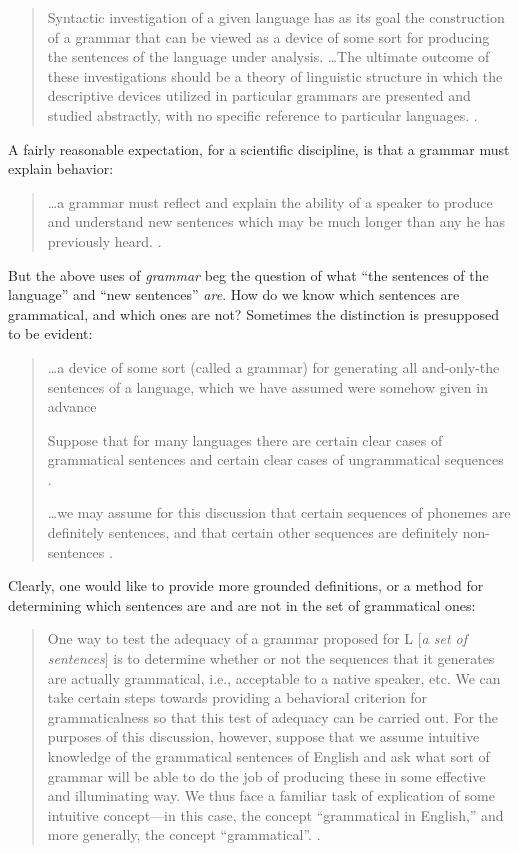 \begin{quote}
Syntactic investigation of a given language has as its goal the construction of a grammar that can be viewed as a device of some sort for producing the sentences of the language under analysis. …The ultimate outcome of these investigations should be a theory of linguistic structure in which the descriptive devices utilized in particular grammars are presented and studied abstractly, with no specific reference to particular languages. \citep[11]{Chomsky1957}.
\end{quote}

A fairly reasonable expectation, for a scientific discipline, is that a grammar must explain behavior:

\begin{quote}
…a grammar must reflect and explain the ability of a speaker to produce and understand new sentences which may be much longer than any he has previously heard. \citep[124]{Chomsky1956}.
\end{quote}

  But the above uses of \textit{grammar} beg the question of what “the sentences of the language” and “new sentences” \textit{are}. How do we know which sentences are grammatical, and which ones are not? Sometimes the distinction is presupposed to be evident:

\begin{quote}
…a device of some sort (called a grammar) for generating all and-only-the sentences of a language, which we have assumed were somehow given in advance \citep[85]{Chomsky1957}

Suppose that for many languages there are certain clear cases of grammatical sentences and certain clear cases of ungrammatical sequences \citep[113]{Chomsky1956}.

…we may assume for this discussion that certain sequences of phonemes are definitely sentences, and that certain other sequences are definitely non-sentences \citep[14]{Chomsky1957}.
\end{quote}

Clearly, one would like to provide more grounded definitions, or a method for determining which sentences are and are not in the set of grammatical ones:

\begin{quote}
One way to test the adequacy of a grammar proposed for L [\textit{a set of sentences}] is to determine whether or not the sequences that it generates are actually grammatical, i.e., acceptable to a native speaker, etc. We can take certain steps towards providing a behavioral criterion for grammaticalness so that this test of adequacy can be carried out. For the purposes of this discussion, however, suppose that we assume intuitive knowledge of the grammatical sentences of English and ask what sort of grammar will be able to do the job of producing these in some effective and illuminating way. We thus face a familiar task of explication of some intuitive concept—in this case, the concept “grammatical in English,” and more generally, the concept “grammatical”. \citep[13]{Chomsky1957}.
\end{quote}

